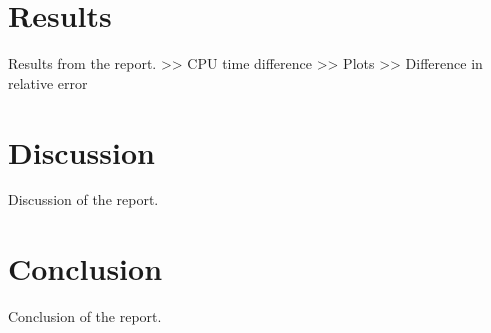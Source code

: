 \documentclass[10pt, a4paper]{amsart}
\begin{document}
\section{Results}
Results from the report.
>> CPU time difference >> Plots >> Difference in relative error

\section{Discussion}
Discussion of the report.
\section{Conclusion}
Conclusion of the report.




\end{document}
